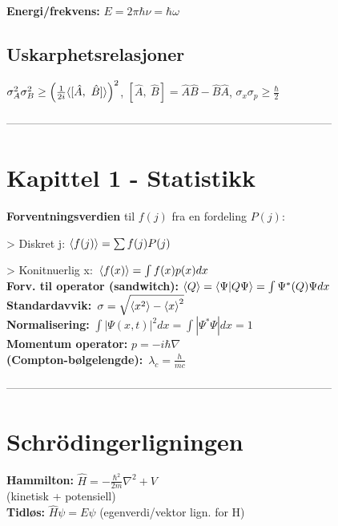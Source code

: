 \documentclass[10p,a4paper]{extarticle}
\begin{document}
\begin{multicols}{2}
\textbf{Energi/frekvens:} $E = 2\pi\hbar\nu = \hbar\omega$


\subsection*{Uskarphetsrelasjoner}
$\sigma_A^2\sigma_B^2 \geq \qty(\frac{1}{2i}\langle [\hat{A},\ \hat{B}]\rangle )^2$,
\quad $[\hat{A},\ \hat{B}] = \hat{A}\hat{B} - \hat{B}\hat{A}$, \quad $\sigma_x\sigma_p \geq \frac{\hbar}{2}$


---------------------------------------------------------------------------------------



\section*{Kapittel 1 - Statistikk}

\textbf{Forventningsverdien} til $f(j)$ fra en fordeling $P(j)$:

> Diskret j: $\expval{f(j)} = \sum f(j) P(j)$

> Konitnuerlig x: $\expval{f(x)} = \int f(x) p(x) dx$
\\

\textbf{Forv. til operator (sandwitch):} $\expval{Q} = \bra{\Psi}\ket{Q\Psi} = \int \Psi^* (Q) \Psi dx$
\\

\textbf{Standardavvik:} $\sigma = \sqrt{\expval{x^2} - \expval{x}^2}$
\\

\textbf{Normalisering:} $\int |\Psi(x,t)|^2 dx = \int |\Psi^*\Psi| dx = 1$
\\

\textbf{Momentum operator:} $p = -i\hbar\nabla$
\\

\textbf{(Compton-bølgelengde):} $\lambda_c = \frac{h}{mc}$


---------------------------------------------------------------------------------------

\section*{Schrödingerligningen}

\textbf{Hammilton:} $\hat{H} = -\frac{\hbar^2}{2m}\nabla^2 + V$\\
(kinetisk + potensiell)
\\

\textbf{Tidløs:} $\hat{H}\psi = E\psi$ (egenverdi/vektor lign. for H)


\end{multicols}
\end{document}

